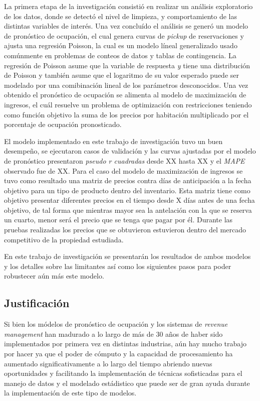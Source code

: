 La primera etapa de la investigación consistió en realizar un análisis exploratorio de los datos, donde se detectó el nivel de limpieza, y comportamiento de las distintas variables de interés. Una vez concluído el análisis se generó un modelo de pronóstico de ocupación, el cual genera curvas de \emph{pickup} de reservaciones y ajusta una regresión Poisson, la cual es un modelo líneal generalizado usado comúnmente en problemas de conteos de datos y tablas de contingencia. La regresión de Poisson asume que la variable de respuesta \emph{y} tiene una distribución de Poisson y también asume que el logaritmo de su valor esperado puede ser modelado por una comibinación lineal de los parámetros desconocidos. Una vez obtenido el pronóstico de ocupación se alimenta al modelo de maximización de ingresos, el cuál resuelve un problema de optimización con restricciones teniendo como función objetivo la suma de los precios por habitación multiplicado por el porcentaje de ocupación pronosticado.

El modelo implementado en este trabajo de investigación tuvo un buen desempeño, se ejecutaron casos de validación y las curvas ajustadas por el modelo de pronóstico presentaron \emph{pseudo r cuadradas} desde XX hasta XX y el \emph{MAPE} observado fue de XX. Para el caso del modelo de maximización de ingresos se tuvo como resultado una matriz de precios contra días de anticipación a la fecha objetivo para un tipo de producto dentro del inventario. Esta matriz tiene como objetivo presentar diferentes precios en el tiempo desde X días antes de una fecha objetivo, de tal forma que mientras mayor sea la antelación con la que se reserva un cuarto, menor será el precio que se tenga que pagar por él. Durante las pruebas realizadas los precios que se obtuvieron estuvieron dentro del mercado competitivo de la propiedad estudiada.

En este trabajo de investigación se presentarán los resultados de ambos modelos y los detalles sobre las limitantes así como los siguientes pasos para poder robustecer aún más este modelo.

\subsection*{Justificación}

Si bien los módelos de pronóstico de ocupación y los sistemas de \emph{revenue management} han madurado a lo largo de más de 30 años de haber sido implementados por primera vez en distintas industrias, aún hay mucho trabajo por hacer ya que el poder de cómputo y la capacidad de procesamiento ha aumentado significativamente a lo largo del tiempo abriendo nuevas oportunidades y facilitando la implementación de técnicas sofisticadas para el manejo de datos y el modelado estádistico que puede ser de gran ayuda durante la implementación de este tipo de modelos.

